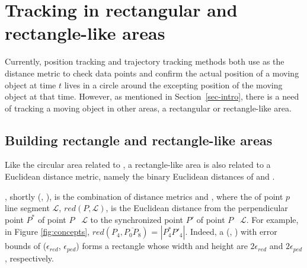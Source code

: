 

\section{Tracking in rectangular and rectangle-like areas}
\label{sec:rectangle}
Currently, position tracking and trajectory tracking methods both use \sed as the distance metric to check data points and confirm the actual position of a moving object at time $t$ lives in a circle around the excepting position of the moving object at that time.
{However, as mentioned in Section~\ref{sec-intro}, there is a need of tracking a moving object in other areas, \eg a rectangular or rectangle-like area.}
%

\subsection{Building rectangle and rectangle-like areas}

Like the circular area related to \sed, a rectangle-like area is also related to a Euclidean distance metric, namely the binary Euclidean distances of \sed and \ped.

, shortly \bed (\red, \ped), is the combination of distance metrics \red and \ped, where the \red of point $p$ \wrt line segment $\mathcal{L}$, $red(P, \mathcal{L})$, is the Euclidean distance from the perpendicular point $P^*$ of point $P$ \wrt~$\mathcal{L}$ to the synchronized point $P'$ of point $P$ \wrt~$\mathcal{L}$. For example, in Figure \ref{fig:concepts}, $red(P_4, \overline{P_0P_8})$ = $|P^*_4P'_4|$. Indeed, a \bed (\red, \ped) with error bounds of ($\epsilon_{red}$, $\epsilon_{ped}$) forms a rectangle whose width and height are $2\epsilon_{red}$ and $2\epsilon_{ped}$, respectively.


